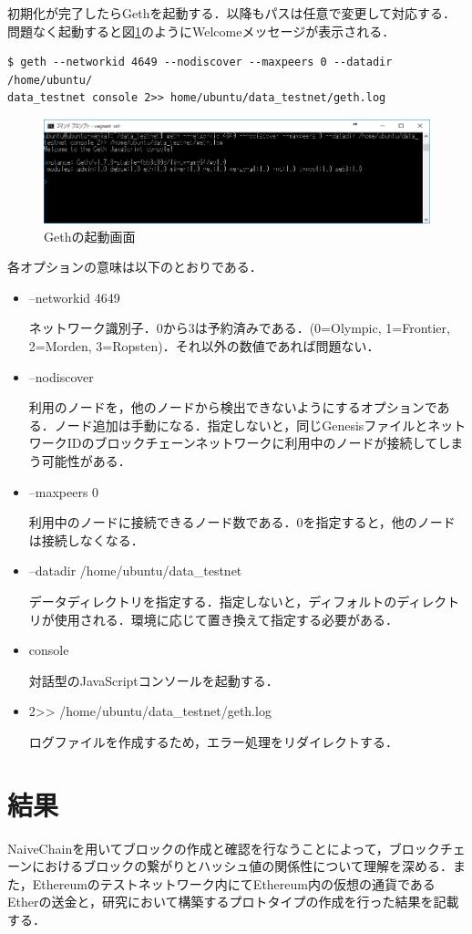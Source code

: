 初期化が完了したらGethを起動する．以降もパスは任意で変更して対応する．問題なく起動すると図\ref{gethup}のようにWelcomeメッセージが表示される．
\begin{verbatim}
$ geth --networkid 4649 --nodiscover --maxpeers 0 --datadir /home/ubuntu/
data_testnet console 2>> home/ubuntu/data_testnet/geth.log
\end{verbatim}
\begin{figure}[htb]
\centering
\includegraphics[width=12cm]{images/gethup.png}
\caption{Gethの起動画面}\label{gethup}
\end{figure}
各オプションの意味は以下のとおりである．
\begin{itemize}
\item --networkid 4649

ネットワーク識別子．0から3は予約済みである．(0=Olympic, 1=Frontier, 2=Morden, 3=Ropsten)．それ以外の数値であれば問題ない．
\item --nodiscover

利用のノードを，他のノードから検出できないようにするオプションである．ノード追加は手動になる．指定しないと，同じGenesisファイルとネットワークIDのブロックチェーンネットワークに利用中のノードが接続してしまう可能性がある．
\item --maxpeers 0

利用中のノードに接続できるノード数である．0を指定すると，他のノードは接続しなくなる．
\item --datadir /home/ubuntu/data\_testnet

データディレクトリを指定する．指定しないと，ディフォルトのディレクトリが使用される．環境に応じて置き換えて指定する必要がある．
\item console

対話型のJavaScriptコンソールを起動する．
\item 2>> /home/ubuntu/data\_testnet/geth.log

ログファイルを作成するため，エラー処理をリダイレクトする．
\end{itemize}

\chapter{結果}
NaiveChainを用いてブロックの作成と確認を行なうことによって，ブロックチェーンにおけるブロックの繋がりとハッシュ値の関係性について理解を深める．また，Ethereumのテストネットワーク内にてEthereum内の仮想の通貨であるEtherの送金と，研究において構築するプロトタイプの作成を行った結果を記載する．

